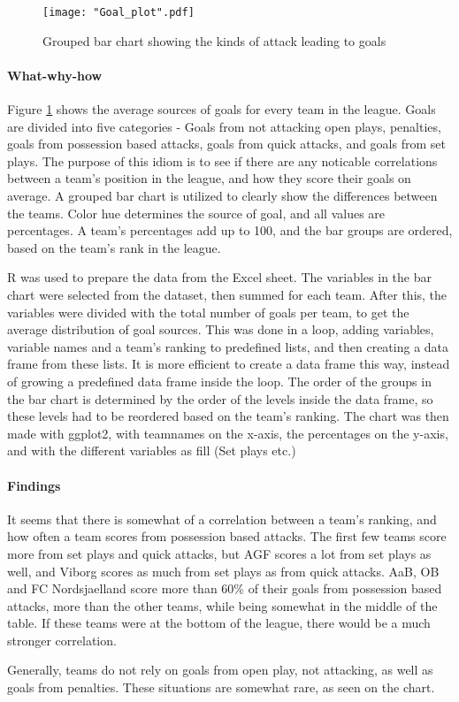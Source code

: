 \documentclass[Report.tex]{subfiles}
\begin{document}
\begin{figure}
\center
\texttt{[image: "Goal\_plot".pdf]}
\caption{Grouped bar chart showing the kinds of attack leading to goals}
\label{Fig:Goal_plot}
\end{figure}

\paragraph{What-why-how\\}
Figure \ref{Fig:Goal_plot} shows the average sources of goals for every team in the
league. Goals are divided into five categories - Goals from not attacking open
plays, penalties, goals from possession based attacks, goals from quick attacks,
and goals from set plays. 
The purpose of this idiom is to see if there are any noticable correlations
between a team's position in the league, and how they score their goals on
average. 
A grouped bar chart is utilized to clearly show the differences between the
teams. Color hue determines the source of goal, and all values are
percentages. A team's percentages add up to 100, and the bar groups are ordered,
based on the team's rank in the league. 

R was used to prepare the data from the Excel sheet. The variables in the bar
chart were selected from the dataset, then summed for each team. After this, the
variables were divided with the total number of goals per team, to get the
average distribution of goal sources. 
This was done in a loop, adding variables, variable names and a team's ranking
to predefined lists, and then creating a data frame from these lists. It is more
efficient to create a data frame this way, instead of growing a predefined data
frame inside the loop. 
The order of the groups in the bar chart is determined by the order of the
levels inside the data frame, so these levels had to be reordered based on the
team's ranking.
The chart was then made with ggplot2, with teamnames on the x-axis, the
percentages on the y-axis, and with the different variables as fill (Set plays
etc.)

\paragraph{Findings\\}
It seems that there is somewhat of a correlation between a team's ranking, and how often a team scores from possession based attacks. The first few teams score more from set plays and quick attacks, but AGF scores a lot from set plays as well, and Viborg scores as much from set plays as from quick attacks. AaB, OB and FC Nordsjaelland score more than 60\% of their goals from possession based attacks, more than the other teams, while being somewhat in the middle of the table. If these teams were at the bottom of the league, there would be a much stronger correlation. 

Generally, teams do not rely on goals from open play, not attacking, as well as goals from penalties. These situations are somewhat rare, as seen on the chart. 
\end{document}
